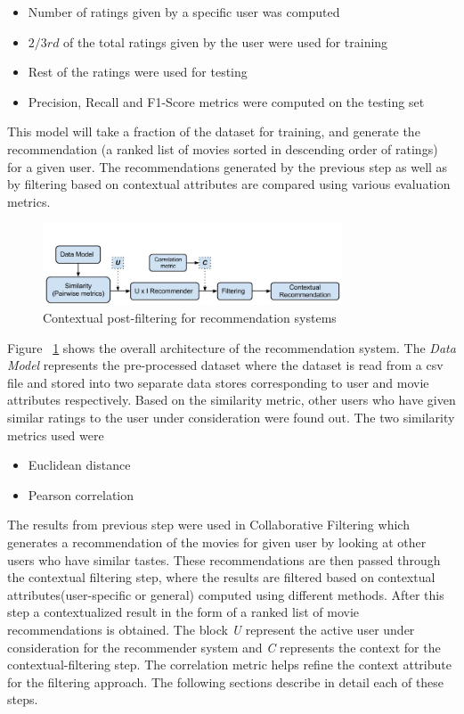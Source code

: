 \documentclass{article}
\begin{document}
\begin{itemize}
\item Number of ratings given by a specific user was computed 
\item $2/3rd$ of the total ratings given by the user were used for training
\item Rest of the ratings were used for testing
\item Precision, Recall and F1-Score metrics were computed on the testing set 
\end{itemize}

This model will take a fraction of the dataset for training, and generate the recommendation (a ranked list of movies sorted in descending order of ratings) for a given user. The recommendations generated by the previous step as well as by filtering based on contextual attributes are compared using various evaluation metrics.

\begin{figure}[H]
\centering
\includegraphics[width=3.5in]{archdiagram.jpg}
\caption{Contextual post-filtering for recommendation systems}
\label{archdiag}
\end{figure}

Figure ~\ref{archdiag} shows the overall architecture of the recommendation system. The \textit{Data Model} represents the pre-processed dataset where the dataset is read from a csv file and stored into two separate data stores corresponding to user and movie attributes respectively. Based on the similarity metric, other users who have given similar ratings to the user under consideration were found out.     The two similarity metrics used were

\begin{itemize}
\item Euclidean distance 
\item Pearson correlation
\end{itemize}

The results from previous step were used in Collaborative Filtering which generates a recommendation of the movies for given user by looking at other users who have similar tastes. These recommendations are then passed through the contextual filtering step, where the results are filtered based on contextual attributes(user-specific or general) computed using different methods. After this step a contextualized result in the form of a ranked list of movie recommendations is obtained. The block \textit{U} represent the active user under consideration for the recommender system and \textit{C} represents the context for the contextual-filtering step. The correlation metric helps refine the context attribute for the filtering approach. The following sections describe in detail each of these steps.
\end{document}
